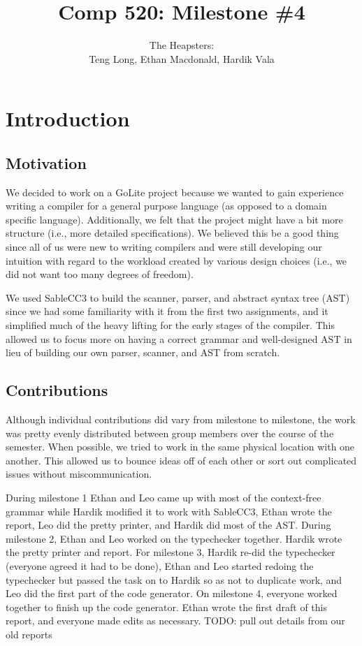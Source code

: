 \documentclass{article}
\title{Comp 520: Milestone \#4}
\author{The Heapsters: \\Teng Long, Ethan Macdonald, Hardik Vala}
\date{}
\begin{document}
\maketitle

\section{Introduction}

\subsection{Motivation}
We decided to work on a GoLite project because we wanted to gain experience writing a compiler for a general purpose language (as opposed to a domain specific language). Additionally, we felt that the project might have a bit more structure (i.e., more detailed specifications). We believed this be a good thing since all of us were new to writing compilers and were still developing our intuition with regard to the workload created by various design choices (i.e., we did not want too many degrees of freedom).

We used SableCC3 to build the scanner, parser, and abstract syntax tree (AST) since we had some familiarity with it from the first two assignments, and it simplified much of the heavy lifting for the early stages of the compiler. This allowed us to focus more on having a correct grammar and well-designed AST in lieu of building our own parser, scanner, and AST from scratch.

\subsection{Contributions}
Although individual contributions did vary from milestone to milestone, the work was pretty evenly distributed between group members over the course of the semester. When possible, we tried to work in the same physical location with one another. This allowed us to bounce ideas off of each other or sort out complicated issues without miscommunication.

During milestone 1 Ethan and Leo came up with most of the context-free grammar while Hardik modified it to work with SableCC3, Ethan wrote the report, Leo did the pretty printer, and Hardik did most of the AST. During milestone 2, Ethan and Leo worked on the typechecker together. Hardik wrote the pretty printer and report. For milestone 3, Hardik re-did the typechecker (everyone agreed it had to be done), Ethan and Leo started redoing the typechecker but passed the task on to Hardik so as not to duplicate work, and Leo did the first part of the code generator. On milestone 4, everyone worked together to finish up the code generator. Ethan wrote the first draft of this report, and everyone made edits as necessary. TODO: pull out details from our old reports
\end{document}
